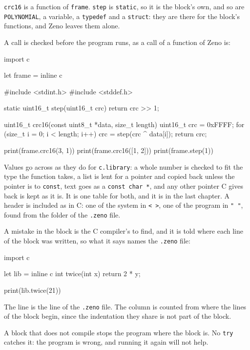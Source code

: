 \verb|crc16| is a function of \verb|frame|. \verb|step| is
\verb|static|, so it is the block's own, and so are
\verb|POLYNOMIAL|, a variable, a \verb|typedef| and a \verb|struct|:
they are there for the block's functions, and Zeno leaves them alone.

A call is checked before the program runs, as a call of a function of
Zeno is:

\begin{zeno}[file=calls.zeno, dir=blocks, cmd=zeno check {file}, fails=yes]
import c

let frame = inline c {
    #include <stdint.h>
    #include <stddef.h>

    static uint16_t step(uint16_t crc) { return crc >> 1; }

    uint16_t crc16(const uint8_t *data, size_t length) {
        uint16_t crc = 0xFFFF;
        for (size_t i = 0; i < length; i++) {
            crc = step(crc ^ data[i]);
        }
        return crc;
    }
}

print(frame.crc16(3, 1))
print(frame.crc16([1, 2]))
print(frame.step(1))
\end{zeno}

Values go across as they do for \verb|c.library|: a whole number is
checked to fit the type the function takes, a list is lent for a
pointer and copied back unless the pointer is to \verb|const|, text
goes as a \verb|const char *|, and any other pointer C gives back is
kept as it is. It is one table for both, and it is in the last
chapter. A header is included as in C: one of the system in
\verb|< >|, one of the program in \verb|" "|, found from the folder of
the \verb|.zeno| file.

A mistake in the block is the C compiler's to find, and it is told
where each line of the block was written, so what it says names the
\verb|.zeno| file:

\begin{zeno}[file=sensor.zeno, dir=blocks, fails=yes]
import c

let lib = inline c {
    int twice(int x) { return 2 * y; }
}

print(lib.twice(21))
\end{zeno}

The line is the line of the \verb|.zeno| file. The column is counted
from where the lines of the block begin, since the indentation they
share is not part of the block.

A block that does not compile stops the program where the block is.
No \verb|try| catches it: the program is wrong, and running it again
will not help.

